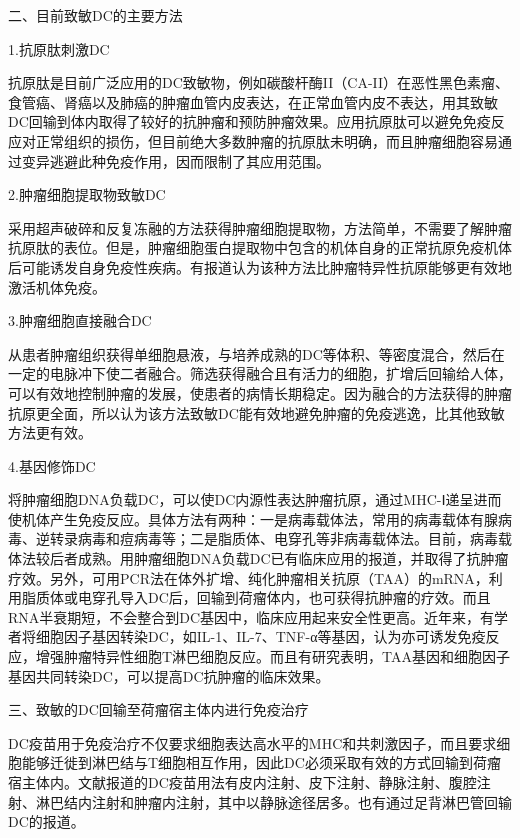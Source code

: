 \begin{center}
 {\large 二、目前致敏DC的主要方法}
 \end{center}

1.抗原肽刺激DC

抗原肽是目前广泛应用的DC致敏物，例如碳酸杆酶II（CA-II）在恶性黑色素瘤、食管癌、肾癌以及肺癌的肿瘤血管内皮表达，在正常血管内皮不表达，用其致敏DC回输到体内取得了较好的抗肿瘤和预防肿瘤效果。应用抗原肽可以避免免疫反应对正常组织的损伤，但目前绝大多数肿瘤的抗原肽未明确，而且肿瘤细胞容易通过变异逃避此种免疫作用，因而限制了其应用范围。

2.肿瘤细胞提取物致敏DC

采用超声破碎和反复冻融的方法获得肿瘤细胞提取物，方法简单，不需要了解肿瘤抗原肽的表位。但是，肿瘤细胞蛋白提取物中包含的机体自身的正常抗原免疫机体后可能诱发自身免疫性疾病。有报道认为该种方法比肿瘤特异性抗原能够更有效地激活机体免疫。

3.肿瘤细胞直接融合DC

从患者肿瘤组织获得单细胞悬液，与培养成熟的DC等体积、等密度混合，然后在一定的电脉冲下使二者融合。筛选获得融合且有活力的细胞，扩增后回输给人体，可以有效地控制肿瘤的发展，使患者的病情长期稳定。因为融合的方法获得的肿瘤抗原更全面，所以认为该方法致敏DC能有效地避免肿瘤的免疫逃逸，比其他致敏方法更有效。

4.基因修饰DC

将肿瘤细胞DNA负载DC，可以使DC内源性表达肿瘤抗原，通过MHC-Ⅰ递呈进而使机体产生免疫反应。具体方法有两种：一是病毒载体法，常用的病毒载体有腺病毒、逆转录病毒和痘病毒等；二是脂质体、电穿孔等非病毒载体法。目前，病毒载体法较后者成熟。用肿瘤细胞DNA负载DC已有临床应用的报道，并取得了抗肿瘤疗效。另外，可用PCR法在体外扩增、纯化肿瘤相关抗原（TAA）的mRNA，利用脂质体或电穿孔导入DC后，回输到荷瘤体内，也可获得抗肿瘤的疗效。而且RNA半衰期短，不会整合到DC基因中，临床应用起来安全性更高。近年来，有学者将细胞因子基因转染DC，如IL-1、IL-7、TNF-α等基因，认为亦可诱发免疫反应，增强肿瘤特异性细胞T淋巴细胞反应。而且有研究表明，TAA基因和细胞因子基因共同转染DC，可以提高DC抗肿瘤的临床效果。

\begin{center}
 {\large 三、致敏的DC回输至荷瘤宿主体内进行免疫治疗}
 \end{center}

DC疫苗用于免疫治疗不仅要求细胞表达高水平的MHC和共刺激因子，而且要求细胞能够迁徙到淋巴结与T细胞相互作用，因此DC必须采取有效的方式回输到荷瘤宿主体内。文献报道的DC疫苗用法有皮内注射、皮下注射、静脉注射、腹腔注射、淋巴结内注射和肿瘤内注射，其中以静脉途径居多。也有通过足背淋巴管回输DC的报道。

